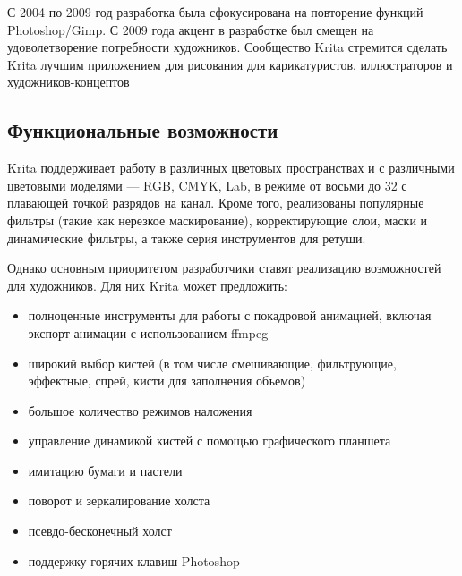 С 2004 по 2009 год разработка была сфокусирована на повторение функций Photoshop/Gimp. С 2009 года  акцент в разработке был смещен на удоволетворение потребности художников. Сообщество Krita стремится сделать Krita лучшим приложением для рисования для карикатуристов, иллюстраторов и художников-концептов\cite{book2}
\subsection{Функциональные возможности}
Krita поддерживает работу в различных цветовых пространствах и с различными цветовыми моделями — RGB, CMYK, Lab, в режиме от восьми до 32 с плавающей точкой разрядов на канал. Кроме того, реализованы популярные фильтры (такие как нерезкое маскирование), корректирующие слои, маски и динамические фильтры, а также серия инструментов для ретуши.

Однако основным приоритетом разработчики ставят реализацию возможностей для художников. Для них Krita может предложить:
\begin{itemize}
 \item полноценные инструменты для работы с покадровой анимацией, включая экспорт анимации с использованием ffmpeg
\item широкий выбор кистей (в том числе смешивающие, фильтрующие, эффектные, спрей, кисти для заполнения объемов)
\item большое количество режимов наложения
\item управление динамикой кистей с помощью графического планшета
\item имитацию бумаги и пастели
\item поворот и зеркалирование холста
\item псевдо-бесконечный холст
\item поддержку горячих клавиш Photoshop
\end{itemize}












